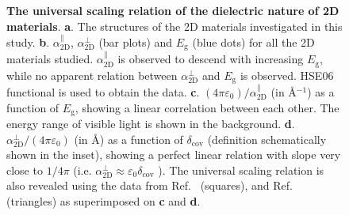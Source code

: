 

\begin{figure}[H]
\centering
\caption{\label{fig-3} \textbf{The universal scaling relation of the
    dielectric nature of 2D materials}. \textbf{a}. The structures of
  the 2D materials investigated in this
  study. \textbf{b}. $\alpha_{\mathrm{2D}}^{\parallel}$,
  $\alpha_{\mathrm{2D}}^{\perp}$ (bar plots) and $E_{\mathrm{g}}$
  (blue dots) for all the 2D materials studied.
  $\alpha_{\mathrm{2D}}^{\parallel}$ is observed to descend with
  increasing $E_{\mathrm{g}}$, while no apparent relation between
  $\alpha_{\mathrm{2D}}^{\perp}$ and $E_{\mathrm{g}}$ is
  observed. HSE06 functional is used to obtain the data. \textbf{c}.
  $(4\pi \varepsilon_{0})/\alpha_{\mathrm{2D}}^{\parallel}$ (in
  \AA{}$^{-1}$) as a function of $E_{\mathrm{g}}$, showing a linear
  correlation between each other. The energy range of visible light is
  shown in the background. \textbf{d}.
  $\alpha_{\mathrm{2D}}^{\perp}/(4\pi\varepsilon_{0})$ (in \AA{}) as a
  function of $\delta_{\mathrm{cov}}$ (definition schematically shown
  in the inset), showing a perfect linear relation with slope very
  close to $1/4\pi$ (i.e.
  $\alpha_{\mathrm{2D}}^{\perp} \approx \varepsilon_{0}
  \delta_{\mathrm{cov}}$ ). The universal scaling relation is also
  revealed using the data from Ref.~\cite{Haastrup_2018} (squares),
  and Ref.~\cite{Mounet_2018} (triangles) as superimposed on
  \textbf{c} and \textbf{d}.}
\end{figure}




